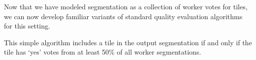 \par Now that we have modeled segmentation as a collection of worker votes for tiles, we can now develop familiar variants of standard quality evaluation algorithms for this setting.

\par \noindent This simple algorithm includes a tile in the output segmentation if and only if the tile has `yes' votes from at least 50\% of all worker segmentations.

